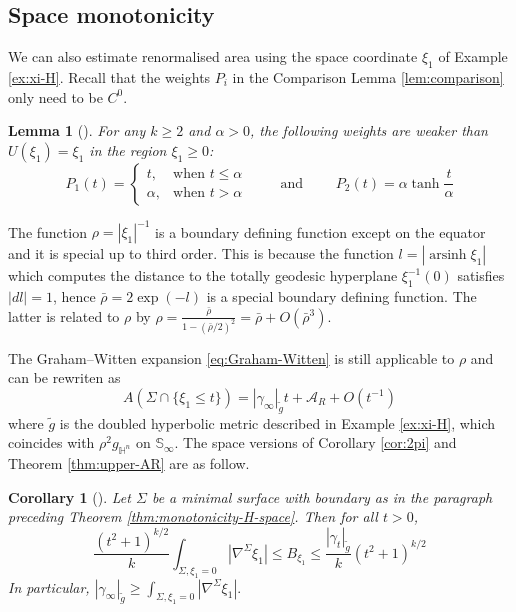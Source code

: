 \documentclass[11pt]{article}
\newtheorem{lemma}[theorem]{Lemma}
\newtheorem{corollary}[theorem]{Corollary}
\DeclareMathOperator\arsinh{arsinh}
\begin{document}
\subsection{Space monotonicity}
\label{sec:org5e85416}
We can also estimate renormalised area using the space coordinate \(\xi_1\) of Example
\ref{ex:xi-H}. Recall that the weights \(P_i\) in the Comparison Lemma \ref{lem:comparison}
only need to be \(C^0\).

\begin{lemma}[]
\label{lem:weaker-space}
For any \(k\geq 2\) and \(\alpha >0\), the following weights are weaker than \(U(\xi_1) = \xi_1\) in the region \(\xi_1\geq 0\):
   \[
    P_1 (t) = \begin{cases}
    t  ,  & \text{when $t\leq \alpha$} \\
    \alpha	  , & \text{when $t > \alpha$}
	  \end{cases}
	  \qquad \text{ and }\qquad P_2(t) = \alpha\tanh \frac{t}{\alpha}
   \]
\end{lemma}

The function \(\rho = |\xi_1|^{-1}\) is a boundary defining function except on the
equator and it is special up to third order. This is because the
function \(l=|\arsinh\xi_1|\) which computes the distance to the totally geodesic hyperplane \(\xi_1^{-1}(0)\)
satisfies \(|dl|=1\), hence \(\bar\rho = 2\exp(-l)\) is a special boundary defining
function. The latter is related to \(\rho\) by \(\rho = \frac{\bar\rho}{1 - (\bar\rho/2)^2}
= \bar\rho + O(\bar\rho^3)\). 

The Graham--Witten expansion \eqref{eq:Graham-Witten} is still applicable to \(\rho\) and can be rewriten as
\begin{equation}
\label{eq:Graham-Witten-space}
A(\Sigma\cap \{ \xi_1 \leq t\}) = |\gamma_\infty|_{\tilde g} t + \mathcal{A}_R + O(t^{-1})	
\end{equation}
where \(\tilde g\) is the
doubled hyperbolic metric described in Example \ref{ex:xi-H},
which coincides with \(\rho^2g_{\mathbb{H}^n}\) on \(\mathbb{S}_\infty\). The
space versions of Corollary \ref{cor:2pi} and Theorem \ref{thm:upper-AR} are as follow.

\begin{corollary}[]
\label{cor:2pi-space}
Let \(\Sigma\) be a minimal surface with boundary as in the paragraph preceding Theorem \ref{thm:monotonicity-H-space}. Then for all \(t > 0\),
   \[
   \frac{(t^2+1)^{k/2}}{k}\int_{\Sigma,\xi_1 = 0}|\nabla^\Sigma\xi_1| \leq B_{\xi_1} \leq \frac{|\gamma_t|_{\tilde g}}{k} (t^2+1)^{k/2}
   \]
In particular,
\(\left|\gamma_\infty\right|_{\tilde g} \geq \int_{\Sigma,\xi_1 = 0}|\nabla^\Sigma\xi_1|.\)
\end{corollary}
\end{document}
